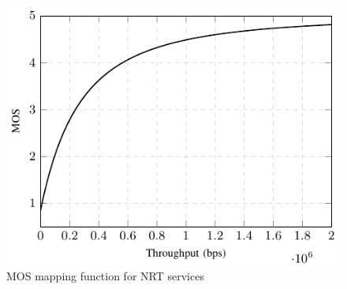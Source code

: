 \documentclass[12pt]{article}
\newcommand{\SecRef}[1]{Section~\ref{#1}}
\newcommand{\EqRef}[1]{Equation~\ref{#1}}
\newcommand{\AppRef}[1]{Appendix~\ref{#1}}
\begin{document}
\begin{figure}
	\centering
	\includegraphics[width=0.55\linewidth]{figs_wp2/figs_BRUNO_PEDRO/MOSTSMQoE}
	\caption{MOS mapping function for NRT services}
	\label{Fig:MOSTSMQoE}
\end{figure}
%
%
%
%
%
\end{document}
